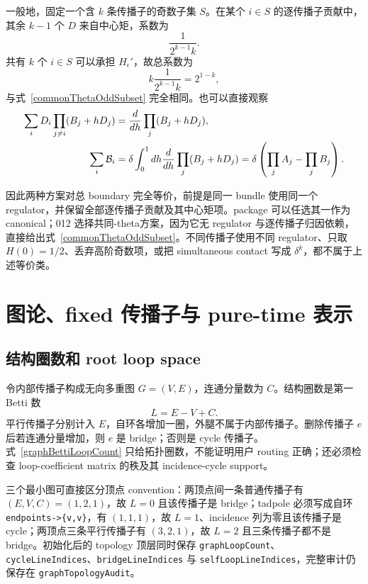 ﻿\documentclass[a4paper,11pt]{article}
\begin{document}
一般地，固定一个含 $k$ 条传播子的奇数子集 $S$。在某个 $i\in S$ 的逐传播子贡献中，其余 $k-1$ 个 $D$ 来自中心矩，系数为
\begin{equation}
 \frac{1}{2^{k-1}k}.
\end{equation}
共有 $k$ 个 $i\in S$ 可以承担 $H_\epsilon'$，故总系数为
\begin{equation}
 k\frac{1}{2^{k-1}k}=2^{1-k},
\end{equation}
与式~\eqref{commonThetaOddSubset} 完全相同。也可以直接观察
\begin{align}
 \sum_iD_i\prod_{j\ne i}(B_j+hD_j)
 &=\frac{d}{dh}\prod_j(B_j+hD_j),\\
 \sum_i{\cal B}_i
 &=\delta\int_0^1dh\frac{d}{dh}\prod_j(B_j+hD_j)
 =\delta\left(\prod_jA_j-\prod_jB_j\right).
\end{align}

因此两种方案对总 boundary 完全等价，前提是同一 bundle 使用同一个 regulator，并保留全部逐传播子贡献及其中心矩项。package 可以任选其一作为 canonical；012 选择共同-theta方案，因为它无 regulator 与逐传播子归因依赖，直接给出式~\eqref{commonThetaOddSubset}。不同传播子使用不同 regulator、只取 $H(0)=1/2$、丢弃高阶奇数项，或把 simultaneous contact 写成 $\delta^k$，都不属于上述等价类。

\section{图论、fixed 传播子与 pure-time 表示}

\subsection{结构圈数和 root loop space}

令内部传播子构成无向多重图 $G=(V,E)$，连通分量数为 $C$。结构圈数是第一 Betti 数
\begin{equation}
 L=E-V+C.
 \label{graphBettiLoopCount}
\end{equation}
平行传播子分别计入 $E$，自环各增加一圈，外腿不属于内部传播子。删除传播子 $e$ 后若连通分量增加，则 $e$ 是 bridge；否则是 cycle 传播子。式~\eqref{graphBettiLoopCount} 只给拓扑圈数，不能证明用户 routing 正确；还必须检查 loop-coefficient matrix 的秩及其 incidence-cycle support。

三个最小图可直接区分顶点 convention：两顶点间一条普通传播子有 $(E,V,C)=(1,2,1)$，故 $L=0$ 且该传播子是 bridge；tadpole 必须写成自环 \texttt{endpoints->\{v,v\}}，有 $(1,1,1)$，故 $L=1$、incidence 列为零且该传播子是 cycle；两顶点三条平行传播子有 $(3,2,1)$，故 $L=2$ 且三条传播子都不是 bridge。初始化后的 topology 顶层同时保存 \texttt{graphLoopCount}、\texttt{cycleLineIndices}、\texttt{bridgeLineIndices} 与 \texttt{selfLoopLineIndices}，完整审计仍保存在 \texttt{graphTopologyAudit}。
\end{document}
